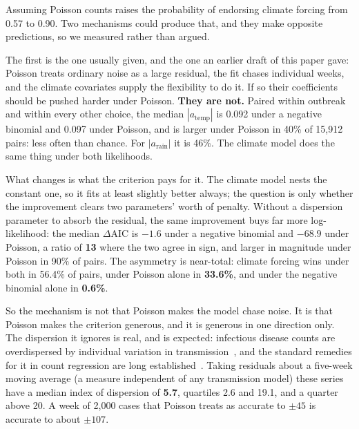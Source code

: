 \documentclass[11pt,a4paper]{article}
\begin{document}
\label{sec:mechanism}
Assuming Poisson counts raises the probability of endorsing climate forcing from
0.57 to 0.90. Two mechanisms could produce that, and they make opposite
predictions, so we measured rather than argued.

The first is the one usually given, and the one an earlier draft of this paper
gave: Poisson treats ordinary noise as a large residual, the fit chases individual
weeks, and the climate covariates supply the flexibility to do it. If so their
coefficients should be pushed harder under Poisson. \textbf{They are not.} Paired
within outbreak and within every other choice, the median $|a_{\mathrm{temp}}|$ is
0.092 under a negative binomial and 0.097 under Poisson, and is larger under
Poisson in 40\% of 15{,}912 pairs: less often than chance. For
$|a_{\mathrm{rain}}|$ it is 46\%. The climate model does the same thing under both
likelihoods.

What changes is what the criterion pays for it. The climate model nests the
constant one, so it fits at least slightly better always; the question is only
whether the improvement clears two parameters' worth of penalty. Without a
dispersion parameter to absorb the residual, the same improvement buys far more
log-likelihood: the median $\Delta$AIC is $-1.6$ under a negative binomial and
$\mathbf{-68.9}$ under Poisson, a ratio of \textbf{13} where the two agree in
sign, and larger in magnitude under Poisson in 90\% of pairs. The asymmetry is
near-total: climate forcing wins under both in 56.4\% of pairs, under Poisson
alone in \textbf{33.6\%}, and under the negative binomial alone in \textbf{0.6\%}.

So the mechanism is not that Poisson makes the model chase noise. It is that
Poisson makes the criterion generous, and it is generous in one direction only.
The dispersion it ignores is real, and is expected: infectious disease counts
are overdispersed by individual variation in transmission~\cite{lloydsmith}, and
the standard remedies for it in count regression are long
established~\cite{mccullagh}. Taking residuals about a five-week moving
average (a measure independent of any transmission model) these series have
a median index of dispersion of \textbf{5.7}, quartiles 2.6 and 19.1, and a
quarter above 20. A week of 2{,}000 cases that Poisson treats as accurate to
$\pm 45$ is accurate to about $\pm 107$.
\end{document}
